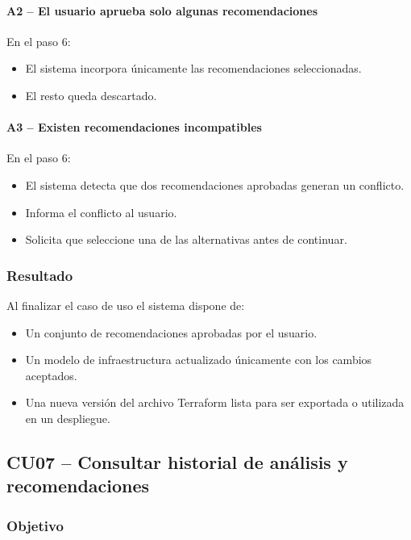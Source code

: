 \paragraph{A2 -- El usuario aprueba solo algunas recomendaciones}

En el paso 6:

\begin{itemize}
\item El sistema incorpora únicamente las recomendaciones seleccionadas.
\item El resto queda descartado.
\end{itemize}

\paragraph{A3 -- Existen recomendaciones incompatibles}

En el paso 6:

\begin{itemize}
\item El sistema detecta que dos recomendaciones aprobadas generan un conflicto.
\item Informa el conflicto al usuario.
\item Solicita que seleccione una de las alternativas antes de continuar.
\end{itemize}

\subsubsection*{Resultado}

Al finalizar el caso de uso el sistema dispone de:

\begin{itemize}
\item Un conjunto de recomendaciones aprobadas por el usuario.
\item Un modelo de infraestructura actualizado únicamente con los cambios aceptados.
\item Una nueva versión del archivo Terraform lista para ser exportada o utilizada en un despliegue.
\end{itemize}

\subsection{CU07 -- Consultar historial de análisis y recomendaciones}

\subsubsection*{Objetivo}

